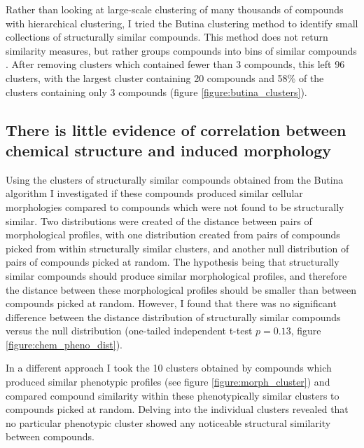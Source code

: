 \documentclass[a4paper,11pt,twoside,openright]{scrbook}
\begin{document}

Rather than looking at large-scale clustering of many thousands of compounds with hierarchical clustering, I tried the Butina clustering method to identify small collections of structurally similar compounds.
This method does not return similarity measures, but rather groups compounds into bins of similar compounds \cite{Butina1999}.
After removing clusters which contained fewer than 3 compounds, this left 96 clusters, with the largest cluster containing 20 compounds and 58\% of the clusters containing only 3 compounds (figure \ref{figure:butina_clusters}).




\subsection{There is little evidence of correlation between chemical structure and induced morphology}

Using the clusters of structurally similar compounds obtained from the Butina algorithm I investigated if these compounds produced similar cellular morphologies compared to compounds which were not found to be structurally similar.
Two distributions were created of the distance between pairs of morphological profiles, with one distribution created from pairs of compounds picked from within structurally similar clusters, and another null distribution of pairs of compounds picked at random.
The hypothesis being that structurally similar compounds should produce similar morphological profiles, and therefore the distance between these morphological profiles should be smaller than between compounds picked at random.
However, I found that there was no significant difference between the distance distribution of structurally similar compounds versus the null distribution (one-tailed independent t-test $p=0.13$, figure \ref{figure:chem_pheno_dist}).


In a different approach I took the 10 clusters obtained by compounds which produced similar phenotypic profiles (see figure \ref{figure:morph_cluster}) and compared compound similarity within these phenotypically similar clusters to compounds picked at random.
Delving into the individual clusters revealed that no particular phenotypic cluster showed any noticeable structural similarity between compounds.
\end{document}
